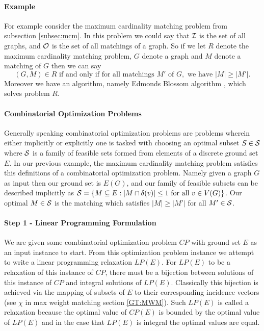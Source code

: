 \paragraph{Example}
For example consider the maximum cardinality matching problem from subsection \ref{subsec:mcm}. In this problem we could say that $\mathcal{I}$ is the set of all graphs, and $\mathcal{O}$ is the set of all matchings of a graph. So if we let $R$ denote the maximum cardinality matching problem, $G$ denote a graph and $M$ denote a matching of $G$ then we can say $$(G,M) \in R \text{ if and only if for all matchings } M'\text{ of } G, \text{ we have } |M| \geq |M'|.$$
Moreover we have an algorithm, namely Edmonds Blossom algorithm \cite{edmonds1965paths}, which solves problem $R$.
\paragraph{Combinatorial Optimization Problems}
Generally speaking combinatorial optimization problems are problems wherein either implicitly or explicitly one is tasked with choosing an optimal subset $S \in \mathcal{S}$ where $\mathcal{S}$ is a family of feasible sets formed from elements of a discrete ground set $E$. In our previous example, the maximum cardinality matching problem satisfies this definitions of a combinatorial optimization problem. Namely given a graph $G$ as input then our ground set is $E(G)$, and our family of feasible subsets can be described implicitly as $\mathcal{S} = \{M \subseteq E: |M \cap \delta(v)| \leq 1 \text{ for all } v\in V(G)\}$. Our optimal $M \in \mathcal{S}$ is the matching which satisfies $|M| \geq |M'|$ for all $M' \in \mathcal{S}$.
\paragraph{Step 1 - Linear Programming Formulation}
We are given some combinatorial optimization  problem $CP$ with ground set $E$ as an input instance to start. From this optimization problem instance we attempt to write a linear programming relaxation $LP(E)$. For $LP(E)$ to be a relaxation of this instance of $CP$, there must be a bijection between solutions of this instance of $CP$ and integral solutions of $LP(E)$. Classically this bijection is achieved via the mapping of subsets of $E$ to their corresponding incidence vectors (see $\chi$ in max weight matching section \ref{GT:MWM}). Such $LP(E)$ is called a relaxation because the optimal value of $CP(E)$ is bounded by the optimal value of $LP(E)$ and in the case that $LP(E)$ is integral the optimal values are equal.

